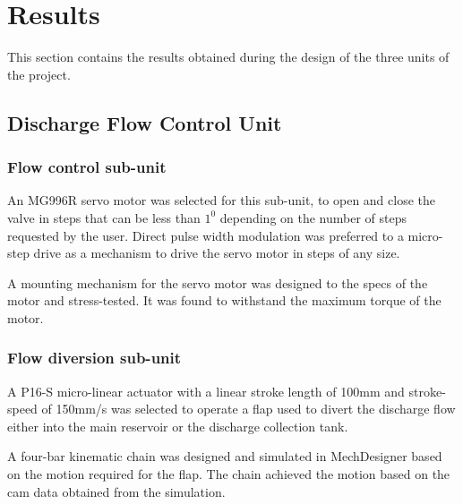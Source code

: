 \section{Results}
This section contains the results obtained during the design of the three units of the project.
\subsection{Discharge Flow Control Unit}
\subsubsection{Flow control sub-unit}
An MG996R servo motor was selected for this sub-unit, to open and close the valve in steps that can be less than $1^{0}$ depending on the number of steps requested by the user. Direct pulse width modulation was preferred to a micro-step drive as a mechanism to drive the servo motor in steps of any size.
\par
A mounting mechanism for the servo motor was designed to the specs of the motor and stress-tested. It was found to withstand the maximum torque of the motor.   
\subsubsection{Flow diversion sub-unit}
A P16-S micro-linear actuator with a linear stroke length of 100mm and stroke-speed of 150mm/s was selected to operate a flap used to divert the discharge flow either into the main reservoir or the discharge collection tank.
\par 
 A four-bar kinematic chain was designed and simulated in MechDesigner based on the motion required for the flap. The chain achieved the motion based on the cam data obtained from the simulation.
\par
